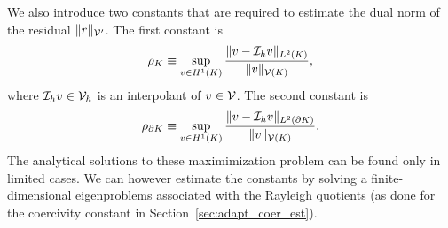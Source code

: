 We also introduce two constants that are required to estimate the dual norm of the residual $\|r \|_{\mathcal{V}'}$.  The first constant is 
\begin{equation}
  \rho_K \equiv \sup_{v \in H^1(K)} \frac{\| v - \mathcal{I}_h v \|_{L^2(K)}}{\| v \|_{\mathcal{V}(K)}} ,
  \label{eq:adapt_rhok}
\end{equation}
where $\mathcal{I}_hv \in \mathcal{V}_h$ is an interpolant of $v \in \mathcal{V}$.  The second constant is 
\begin{equation}
  \rho_{\partial K} \equiv \sup_{v \in H^1(K)} \frac{\| v - \mathcal{I}_h v \|_{L^2(\partial K)}}{ \| v \|_{\mathcal{V}(K)}} .
  \label{eq:adapt_rhopk}
\end{equation}
The analytical solutions to these maximimization problem can be found only in limited cases.  We can however estimate the constants by solving a finite-dimensional eigenproblems associated with the Rayleigh quotients (as done for the coercivity constant in Section~\ref{sec:adapt_coer_est}).


